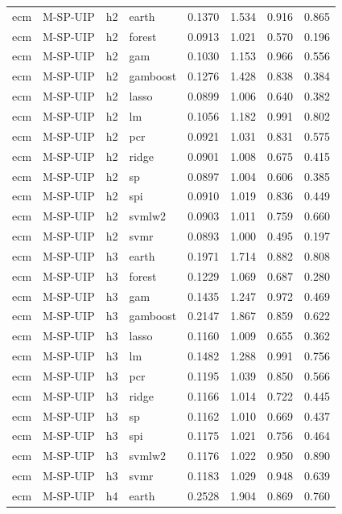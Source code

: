 \begin{ThreePartTable}
\begin{longtable}[t]{llclcccc}
\addlinespace
ecm & M-SP-UIP & h2 & earth & 0.1370 & 1.534 & 0.916 & 0.865\\
ecm & M-SP-UIP & h2 & forest & 0.0913 & 1.021 & 0.570 & 0.196\\
ecm & M-SP-UIP & h2 & gam & 0.1030 & 1.153 & 0.966 & 0.556\\
ecm & M-SP-UIP & h2 & gamboost & 0.1276 & 1.428 & 0.838 & 0.384\\
ecm & M-SP-UIP & h2 & lasso & 0.0899 & 1.006 & 0.640 & 0.382\\
ecm & M-SP-UIP & h2 & lm & 0.1056 & 1.182 & 0.991 & 0.802\\
ecm & M-SP-UIP & h2 & pcr & 0.0921 & 1.031 & 0.831 & 0.575\\
ecm & M-SP-UIP & h2 & ridge & 0.0901 & 1.008 & 0.675 & 0.415\\
ecm & M-SP-UIP & h2 & sp & 0.0897 & 1.004 & 0.606 & 0.385\\
ecm & M-SP-UIP & h2 & spi & 0.0910 & 1.019 & 0.836 & 0.449\\
ecm & M-SP-UIP & h2 & svmlw2 & 0.0903 & 1.011 & 0.759 & 0.660\\
ecm & M-SP-UIP & h2 & svmr & 0.0893 & 1.000 & 0.495 & 0.197\\
\addlinespace
ecm & M-SP-UIP & h3 & earth & 0.1971 & 1.714 & 0.882 & 0.808\\
ecm & M-SP-UIP & h3 & forest & 0.1229 & 1.069 & 0.687 & 0.280\\
ecm & M-SP-UIP & h3 & gam & 0.1435 & 1.247 & 0.972 & 0.469\\
ecm & M-SP-UIP & h3 & gamboost & 0.2147 & 1.867 & 0.859 & 0.622\\
ecm & M-SP-UIP & h3 & lasso & 0.1160 & 1.009 & 0.655 & 0.362\\
ecm & M-SP-UIP & h3 & lm & 0.1482 & 1.288 & 0.991 & 0.756\\
ecm & M-SP-UIP & h3 & pcr & 0.1195 & 1.039 & 0.850 & 0.566\\
ecm & M-SP-UIP & h3 & ridge & 0.1166 & 1.014 & 0.722 & 0.445\\
ecm & M-SP-UIP & h3 & sp & 0.1162 & 1.010 & 0.669 & 0.437\\
ecm & M-SP-UIP & h3 & spi & 0.1175 & 1.021 & 0.756 & 0.464\\
ecm & M-SP-UIP & h3 & svmlw2 & 0.1176 & 1.022 & 0.950 & 0.890\\
ecm & M-SP-UIP & h3 & svmr & 0.1183 & 1.029 & 0.948 & 0.639\\
\addlinespace
ecm & M-SP-UIP & h4 & earth & 0.2528 & 1.904 & 0.869 & 0.760\\

\end{longtable}
\end{ThreePartTable}
